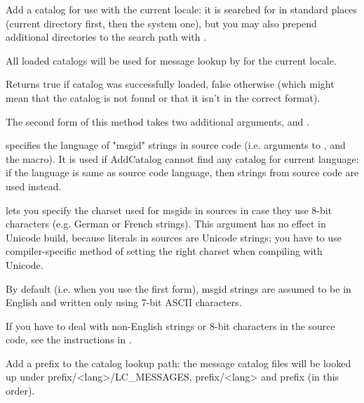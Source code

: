 
Add a catalog for use with the current locale: it is searched for in standard
places (current directory first, then the system one), but you may also prepend
additional directories to the search path with 
.

All loaded catalogs will be used for message lookup by
 for the current locale.

Returns true if catalog was successfully loaded, false otherwise (which might
mean that the catalog is not found or that it isn't in the correct format).

The second form of this method takes two additional arguments,
 and .

 specifies the language of "msgid" strings in source code
(i.e. arguments to ,
 and the 
 macro). It is used if AddCatalog cannot find any
catalog for current language: if the language is same as source code language,
then strings from source code are used instead. 

 lets you specify the charset used for msgids in sources
in case they use 8-bit characters (e.g. German or French strings).  This
argument has no effect in Unicode build, because literals in sources are
Unicode strings; you have to use compiler-specific method of setting the right
charset when compiling with Unicode.

By default (i.e. when you use the first form), msgid strings are assumed
to be in English and written only using 7-bit ASCII characters.

If you have to deal with non-English strings or 8-bit characters in the source
code, see the instructions in 
.


\label{wxlocaleaddcataloglookuppathprefix}


Add a prefix to the catalog lookup path: the message catalog files will be
looked up under prefix/<lang>/LC\_MESSAGES, prefix/<lang> and prefix
(in this order).


